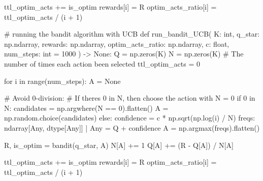 \documentclass[
  letterpaper,
]{krantz}
\makeatletter
\newenvironment{Shaded}{\begin{snugshade}}{\end{snugshade}}
\newcommand{\BuiltInTok}[1]{\textcolor[rgb]{0.00,0.23,0.31}{#1}}
\newcommand{\CommentTok}[1]{\textcolor[rgb]{0.37,0.37,0.37}{#1}}
\newcommand{\ControlFlowTok}[1]{\textcolor[rgb]{0.00,0.23,0.31}{#1}}
\newcommand{\DecValTok}[1]{\textcolor[rgb]{0.68,0.00,0.00}{#1}}
\newcommand{\KeywordTok}[1]{\textcolor[rgb]{0.00,0.23,0.31}{#1}}
\newcommand{\NormalTok}[1]{\textcolor[rgb]{0.00,0.23,0.31}{#1}}
\newcommand{\OperatorTok}[1]{\textcolor[rgb]{0.37,0.37,0.37}{#1}}
\newcommand{\VariableTok}[1]{\textcolor[rgb]{0.07,0.07,0.07}{#1}}
\newenvironment{kframe}{%
\medskip{}
\setlength{\fboxsep}{.8em}
 \def\at@end@of@kframe{}%
 \ifinner\ifhmode%
  \def\at@end@of@kframe{\end{minipage}}%
  \begin{minipage}{\columnwidth}%
 \fi\fi%
 \def\FrameCommand##1{\hskip\@totalleftmargin \hskip-\fboxsep
 \colorbox{shadecolor}{##1}\hskip-\fboxsep
     \hskip-\linewidth \hskip-\@totalleftmargin \hskip\columnwidth}%
 \MakeFramed {\advance\hsize-\width
   \@totalleftmargin\z@ \linewidth\hsize
   \@setminipage}}%
 {\par\unskip\endMakeFramed%
 \at@end@of@kframe}
\renewenvironment{Shaded}{\begin{kframe}}{\end{kframe}}
\theoremstyle{plain}
\theoremstyle{definition}
\theoremstyle{definition}
\theoremstyle{remark}
\makeatother
\begin{document}
\begin{codelisting}
\begin{Shaded}
\begin{Highlighting}[]
\NormalTok{        ttl\_optim\_acts }\OperatorTok{+=}\NormalTok{ is\_optim}
\NormalTok{        rewards[i] }\OperatorTok{=}\NormalTok{ R}
\NormalTok{        optim\_acts\_ratio[i] }\OperatorTok{=}\NormalTok{ ttl\_optim\_acts }\OperatorTok{/}\NormalTok{ (i }\OperatorTok{+} \DecValTok{1}\NormalTok{)}


\CommentTok{\# running the bandit algorithm with UCB}
\KeywordTok{def}\NormalTok{ run\_bandit\_UCB(}
\NormalTok{        K: }\BuiltInTok{int}\NormalTok{,}
\NormalTok{        q\_star: np.ndarray,}
\NormalTok{        rewards: np.ndarray,}
\NormalTok{        optim\_acts\_ratio: np.ndarray,}
\NormalTok{        c: }\BuiltInTok{float}\NormalTok{,}
\NormalTok{        num\_steps: }\BuiltInTok{int} \OperatorTok{=} \DecValTok{1000}
\NormalTok{        ) }\OperatorTok{{-}\textgreater{}} \VariableTok{None}\NormalTok{:}
\NormalTok{    Q }\OperatorTok{=}\NormalTok{ np.zeros(K)}
\NormalTok{    N }\OperatorTok{=}\NormalTok{ np.zeros(K)  }\CommentTok{\# The number of times each action been selected}
\NormalTok{    ttl\_optim\_acts }\OperatorTok{=} \DecValTok{0}
    
    \ControlFlowTok{for}\NormalTok{ i }\KeywordTok{in} \BuiltInTok{range}\NormalTok{(num\_steps):}
\NormalTok{        A }\OperatorTok{=} \VariableTok{None}
        
        \CommentTok{\# Avoid 0{-}division:}
        \CommentTok{\# If there\textquotesingle{}s 0 in N, then choose the action with N = 0}
        \ControlFlowTok{if} \DecValTok{0} \KeywordTok{in}\NormalTok{ N:}
\NormalTok{            candidates }\OperatorTok{=}\NormalTok{ np.argwhere(N }\OperatorTok{==} \DecValTok{0}\NormalTok{).flatten()}
\NormalTok{            A }\OperatorTok{=}\NormalTok{ np.random.choice(candidates)}
        \ControlFlowTok{else}\NormalTok{:}
\NormalTok{            confidence }\OperatorTok{=}\NormalTok{ c }\OperatorTok{*}\NormalTok{ np.sqrt(np.log(i) }\OperatorTok{/}\NormalTok{ N)}
\NormalTok{            freqs: ndarray[Any, dtype[Any]] }\OperatorTok{|}\NormalTok{ Any }\OperatorTok{=}\NormalTok{ Q }\OperatorTok{+}\NormalTok{ confidence}
\NormalTok{            A }\OperatorTok{=}\NormalTok{ np.argmax(freqs).flatten()}
        
\NormalTok{        R, is\_optim }\OperatorTok{=}\NormalTok{ bandit(q\_star, A)}
\NormalTok{        N[A] }\OperatorTok{+=} \DecValTok{1}
\NormalTok{        Q[A] }\OperatorTok{+=}\NormalTok{ (R }\OperatorTok{{-}}\NormalTok{ Q[A]) }\OperatorTok{/}\NormalTok{ N[A]}
        
\NormalTok{        ttl\_optim\_acts }\OperatorTok{+=}\NormalTok{ is\_optim}
\NormalTok{        rewards[i] }\OperatorTok{=}\NormalTok{ R}
\NormalTok{        optim\_acts\_ratio[i] }\OperatorTok{=}\NormalTok{ ttl\_optim\_acts }\OperatorTok{/}\NormalTok{ (i }\OperatorTok{+} \DecValTok{1}\NormalTok{)}



\end{Highlighting}
\end{Shaded}
\end{codelisting}
\end{document}
